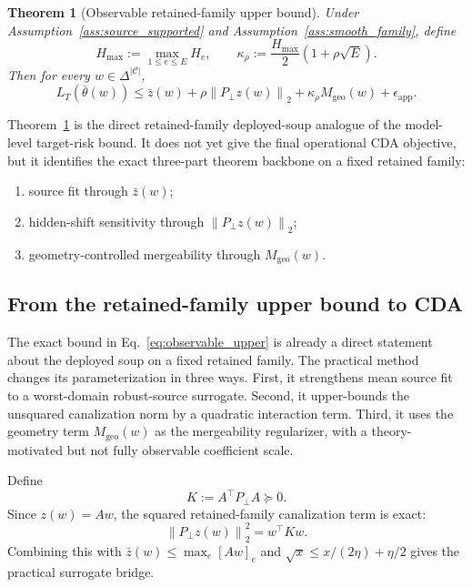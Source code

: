 \documentclass{article}
\newtheorem{theorem}{Theorem}[section]
\theoremstyle{definition}
\newcommand{\cC}{\mathcal{C}}
\newcommand{\cda}{\textup{\textsc{CDA}}}
\newcommand{\simplex}{\Delta}
\newcommand{\norm}[1]{\left\lVert #1 \right\rVert}
\newcommand{\paren}[1]{\left( #1 \right)}
\newcommand{\thetaw}{\bar{\theta}(w)}
\begin{document}
\begin{theorem}[Observable retained-family upper bound]
\label{thm:observable_upper}
Under Assumption~\ref{ass:source_supported} and Assumption~\ref{ass:smooth_family}, define
\[
H_{\max}:=\max_{1\le e\le E} H_e,
\qquad
\kappa_\rho:=\frac{H_{\max}}{2}\paren{1+\rho\sqrt E}.
\]
Then for every \(w\in\simplex^{|\cC|}\),
\begin{equation}
L_T(\thetaw)
\le
\bar z(w)+\rho\norm{P_\perp z(w)}_2+\kappa_\rho M_{\mathrm{geo}}(w)+\epsilon_{\mathrm{app}}.
\label{eq:observable_upper}
\end{equation}
\end{theorem}

Theorem~\ref{thm:observable_upper} is the direct retained-family deployed-soup analogue of the model-level target-risk bound. It does not yet give the final operational \cda{} objective, but it identifies the exact three-part theorem backbone on a fixed retained family:
\begin{enumerate}[leftmargin=1.3em]
    \item source fit through \(\bar z(w)\);
    \item hidden-shift sensitivity through \(\norm{P_\perp z(w)}_2\);
    \item geometry-controlled mergeability through \(M_{\mathrm{geo}}(w)\).
\end{enumerate}

\subsection{From the retained-family upper bound to \cda{}}

The exact bound in Eq.~\eqref{eq:observable_upper} is already a direct statement about the deployed soup on a fixed retained family. The practical method changes its parameterization in three ways.
First, it strengthens mean source fit to a worst-domain robust-source surrogate. Second, it upper-bounds the unsquared canalization norm by a quadratic interaction term. Third, it uses the geometry term \(M_{\mathrm{geo}}(w)\) as the mergeability regularizer, with a theory-motivated but not fully observable coefficient scale.

Define
\[
K:=A^\top P_\perp A \succeq 0.
\]
Since \(z(w)=Aw\), the squared retained-family canalization term is exact:
\[
\norm{P_\perp z(w)}_2^2 = w^\top K w.
\]
Combining this with \(\bar z(w)\le \max_e [Aw]_e\) and \(\sqrt{x}\le x/(2\eta)+\eta/2\) gives the practical surrogate bridge.
\end{document}
